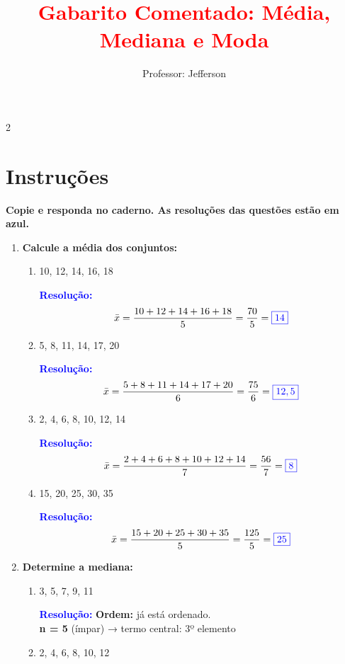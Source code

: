 \documentclass[11pt]{article}
\title{\textcolor{red}{Gabarito Comentado: Média, Mediana e Moda}}
\author{Professor: Jefferson}
\date{}
\newcommand{\respostaNum}[1]{\textcolor{blue}{\boxed{#1}}}
\newcommand{\resolucao}{\textbf{\textcolor{blue}{Resolução:}}}
\begin{document}
\maketitle
\vspace{-0.9cm}

\begin{multicols}{2}

\section*{Instruções}
\textbf{Copie e responda no caderno. As resoluções das questões estão em azul.}


\begin{enumerate}[leftmargin=*]

\item \textbf{Calcule a média dos conjuntos:}

\begin{enumerate}[label=\alph*)]
\item 10, 12, 14, 16, 18

\resolucao
\[
\bar{x} = \frac{10+12+14+16+18}{5} = \frac{70}{5} = \respostaNum{14}
\]

\item 5, 8, 11, 14, 17, 20

\resolucao
\[
\bar{x} = \frac{5+8+11+14+17+20}{6} = \frac{75}{6} = \respostaNum{12,5}
\]

\item 2, 4, 6, 8, 10, 12, 14

\resolucao
\[
\bar{x} = \frac{2+4+6+8+10+12+14}{7} = \frac{56}{7} = \respostaNum{8}
\]

\item 15, 20, 25, 30, 35

\resolucao
\[
\bar{x} = \frac{15+20+25+30+35}{5} = \frac{125}{5} = \respostaNum{25}
\]
\end{enumerate}

\item \textbf{Determine a mediana:}

\begin{enumerate}[label=\alph*)]
\item 3, 5, 7, 9, 11

\resolucao
\textbf{Ordem:} já está ordenado. \\
\textbf{n = 5} (ímpar) → termo central: 3º elemento \\
\respostaNum{7}

\item 2, 4, 6, 8, 10, 12


\end{enumerate}
\end{enumerate}
\end{multicols}
\end{document}
